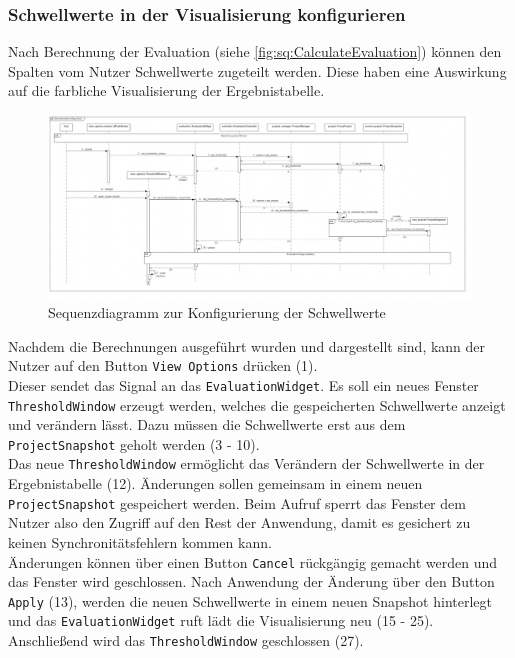 \documentclass{article}
\begin{document}
\subsubsection{Schwellwerte in der Visualisierung konfigurieren}
Nach Berechnung der Evaluation (siehe \ref{fig:sq:CalculateEvaluation}) können den Spalten vom Nutzer Schwellwerte zugeteilt werden. Diese haben eine Auswirkung auf die farbliche Visualisierung der Ergebnistabelle.
\begin{figure}[H]%
    \centering
    \includegraphics[width=13cm]{entwurf/Entwurf_dokument/img/Damian/Schwellwerte konfigurieren.png}
    \caption{Sequenzdiagramm zur Konfigurierung der Schwellwerte}
    \label{fig:sq:ChangeThresholds}
\end{figure}

Nachdem die Berechnungen ausgeführt wurden und dargestellt sind, kann der Nutzer auf den Button \texttt{View Options} drücken (1). \\
Dieser sendet das Signal an das \texttt{EvaluationWidget}. Es soll ein neues Fenster \texttt{ThresholdWindow} erzeugt werden, welches die gespeicherten Schwellwerte anzeigt und verändern lässt. Dazu müssen die Schwellwerte erst aus dem \texttt{ProjectSnapshot} geholt werden (3 - 10).\\
Das neue \texttt{ThresholdWindow} ermöglicht das Verändern der Schwellwerte in der Ergebnistabelle (12). Änderungen sollen gemeinsam in einem neuen \texttt{ProjectSnapshot} gespeichert werden. Beim Aufruf sperrt das Fenster dem Nutzer also den Zugriff auf den Rest der Anwendung, damit es gesichert zu keinen Synchronitätsfehlern kommen kann. \\
Änderungen können über einen Button \texttt{Cancel} rückgängig gemacht werden und das Fenster wird geschlossen. Nach Anwendung der Änderung über den Button \texttt{Apply} (13), werden die neuen Schwellwerte in einem neuen Snapshot hinterlegt und das \texttt{EvaluationWidget} ruft lädt die Visualisierung neu (15 - 25).\\
Anschließend wird das \texttt{ThresholdWindow} geschlossen (27).
\end{document}

